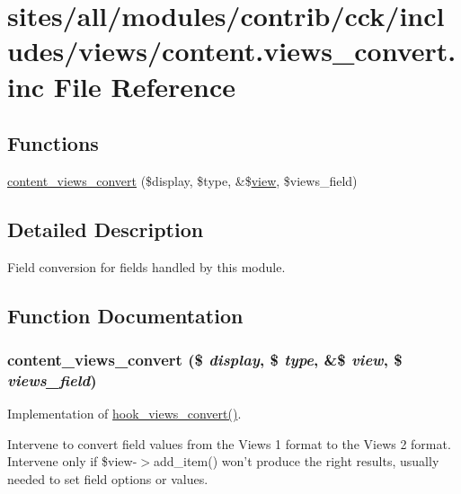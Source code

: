 \hypertarget{content_8views__convert_8inc}{
\section{sites/all/modules/contrib/cck/includes/views/content.views\_\-convert.inc File Reference}
\label{content_8views__convert_8inc}
}
\subsection*{Functions}
\begin{CompactItemize}
\item 
\hyperlink{content_8views__convert_8inc_4d8f48011b7ede34c92d19f042c943ff}{content\_\-views\_\-convert} (\$display, \$type, \&\$\hyperlink{classview}{view}, \$views\_\-field)
\end{CompactItemize}


\subsection{Detailed Description}
Field conversion for fields handled by this module. 

\subsection{Function Documentation}
\hypertarget{content_8views__convert_8inc_4d8f48011b7ede34c92d19f042c943ff}{
\subsubsection[{content\_\-views\_\-convert}]{\setlength{\rightskip}{0pt plus 5cm}content\_\-views\_\-convert (\$ {\em display}, \/  \$ {\em type}, \/  \&\$ {\em view}, \/  \$ {\em views\_\-field})}}
\label{content_8views__convert_8inc_4d8f48011b7ede34c92d19f042c943ff}


Implementation of \hyperlink{group__views__hooks_ge98b0a1c700fe1406af390dfc8c7262e}{hook\_\-views\_\-convert()}.

Intervene to convert field values from the Views 1 format to the Views 2 format. Intervene only if \$view-$>$add\_\-item() won't produce the right results, usually needed to set field options or values. 